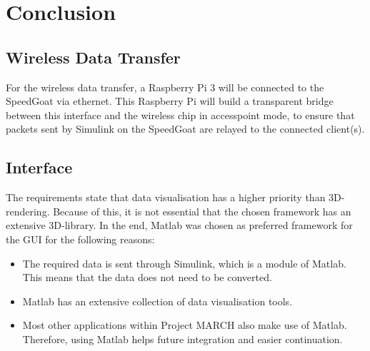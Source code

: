 \section{Conclusion}
\subsection{Wireless Data Transfer}
For the wireless data transfer, a Raspberry Pi 3 will be connected to the SpeedGoat via ethernet. This Raspberry Pi will build a transparent bridge between this interface and the wireless chip in accesspoint mode, to ensure that packets sent by Simulink on the SpeedGoat are relayed to the connected client(s).
\subsection{Interface}
The requirements state that data visualisation has a higher priority than 3D-rendering. Because of this, it is not essential that the chosen framework has an extensive 3D-library. In the end, Matlab was chosen as preferred framework for the GUI for the following reasons:
\begin{itemize}
	\item The required data is sent through Simulink, which is a module of Matlab. This means that the data does not need to be converted.
	\item Matlab has an extensive collection of data visualisation tools.
	\item Most other applications within Project MARCH also make use of Matlab. Therefore, using Matlab helps future integration and easier continuation.
\end{itemize}
